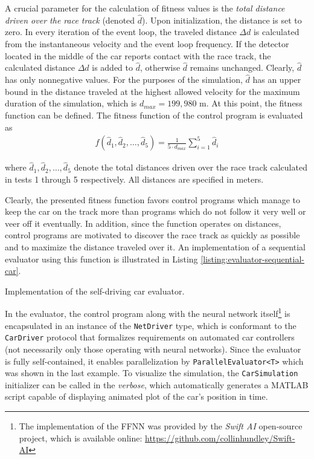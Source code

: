 A crucial parameter for the calculation of fitness values is the \textit{total distance driven over the race track} (denoted $\hat{d}$). Upon initialization, the distance is set to zero. In every iteration of the event loop, the traveled distance $\Delta d$ is calculated from the instantaneous velocity and the event loop frequency. If the detector located in the middle of the car reports contact with the race track, the calculated distance $\Delta d$ is added to $\hat{d}$, otherwise $\hat{d}$ remains unchanged. Clearly, $\hat{d}$ has only nonnegative values. For the purposes of the simulation, $\hat{d}$ has an upper bound in the distance traveled at the highest allowed velocity for the maximum duration of the simulation, which is $d_{max}=199,980$ m. At this point, the fitness function can be defined. The fitness function of the control program is evaluated as
~
\begin{align}
	f(\hat{d}_1,\hat{d}_2,\dots,\hat{d}_5) = \frac{1}{5 \cdot d_{max}} \sum_{i=1}^5 \hat{d}_i
\end{align}

\noindent
where $\hat{d}_1,\hat{d}_2,\dots,\hat{d}_5$ denote the total distances driven over the race track calculated in tests 1 through 5 respectively. All distances are specified in meters.

Clearly, the presented fitness function favors control programs which manage to keep the car on the track more than programs which do not follow it very well or veer off it eventually. In addition, since the function operates on distances, control programs are motivated to discover the race track as quickly as possible and to maximize the distance traveled over it. An implementation of a sequential evaluator using this function is illustrated in Listing \ref{listing:evaluator-sequential-car}.

\begin{listing}[ht]
	\caption{Implementation of the self-driving car evaluator.}
	\label{listing:evaluator-sequential-car}
\end{listing}

In the evaluator, the control program along with the neural network itself\footnote{The implementation of the FFNN was provided by the \textit{Swift AI} open-source project, which is available online: \url{https://github.com/collinhundley/Swift-AI}} is encapsulated in an instance of the \texttt{NetDriver} type, which is conformant to the \texttt{CarDriver} protocol that formalizes requirements on automated car controllers (not necessarily only those operating with neural networks). Since the evaluator is fully self-contained, it enables parallelization by \texttt{ParallelEvaluator<T>} which was shown in the last example. To visualize the simulation, the \texttt{CarSimulation} initializer can be called in the \textit{verbose}, which automatically generates a MATLAB script capable of displaying animated plot of the car's position in time.


